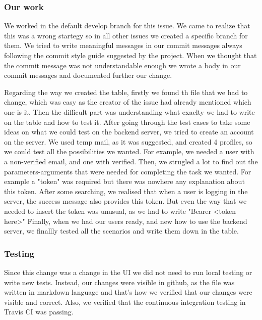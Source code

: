\documentclass{article}
\begin{document}
\subsubsection{Our work}

\hspace{0.5cm}We worked in the default develop branch for this issue. We came to realize that this was a wrong startegy so in all other issues we created a specific branch for them. We tried to write meaningful messages in our commit messages always following the commit style guide suggested by the project. When we thought that the commit message was not understandable enough we wrote a body in our commit messages and documented further our change.

Regarding the way we created the table, firstly we found th file that we had to change, which was easy as the creator of the issue had already mentioned which one is it. Then the difficult part was understanding what exaclty we had to write on the table and how to test it. After going through the test cases to take some ideas on what we could test on the backend server, we tried to create an account on the server. We used temp mail, as it was suggested, and created 4 profiles, so we could test all the possibilities we wanted. For example, we needed a user with a non-verified email, and one with verified. 
Then, we strugled a lot to find out the parameters-arguments that were needed for completing the task we wanted. For example a "token" was required but there was nowhere any explanation about this token. After some searching, we realised that when a user is logging in the server, the success message also provides this token. But even the way that we needed to insert the token was unusual, as we had to write "Bearer <token here>"
Finally, when we had our users ready, and new how to use the backend server, we finallly tested all the scenarios and write them down in the table.

\subsubsection{Testing}
\hspace{0.5cm}Since this change was a change in the UI we did not need to run local testing or write new tests. Instead, our changes were visible in github, as the file was written in markdown language and that's how we verified that our changes were visible and correct. Also, we verified that the continuous integration testing in Travis CI was passing. 
\end{document}
